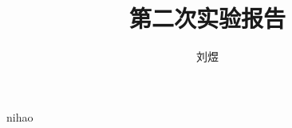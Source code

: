 \documentclass[a4paper,12pt]{article}
\title{第二次实验报告}
\author{刘煜}
\begin{document}
    \maketitle
    nihao
\end{document}
